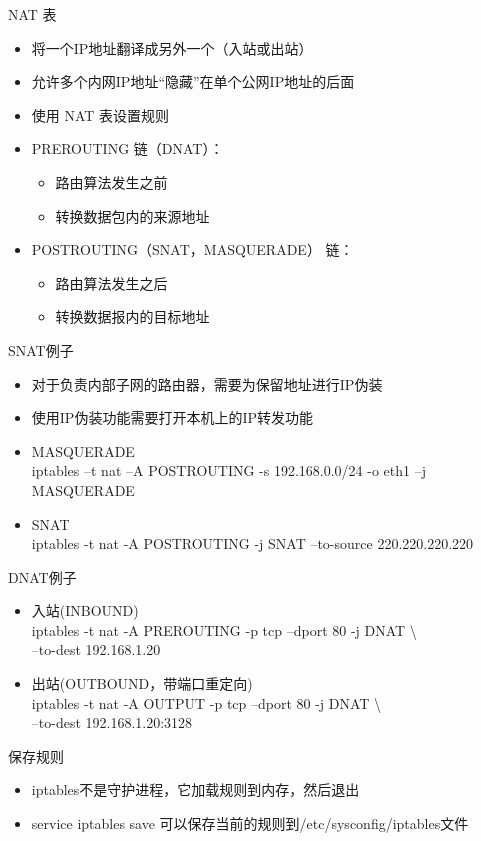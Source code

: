  \begin{frame}{NAT 表}


\begin{itemize}
\item 将一个IP地址翻译成另外一个（入站或出站）
\item 允许多个内网IP地址“隐藏”在单个公网IP地址的后面
\item 使用 NAT 表设置规则
\item PREROUTING 链（DNAT）：

\begin{itemize}
\item 路由算法发生之前
\item 转换数据包内的来源地址
\end{itemize}
\item POSTROUTING（SNAT，MASQUERADE） 链：

\begin{itemize}
\item 路由算法发生之后
\item 转换数据报内的目标地址
\end{itemize}
\end{itemize}

\end{frame} 
 \begin{frame}{SNAT例子}
\begin{itemize}
\item 对于负责内部子网的路由器，需要为保留地址进行IP伪装
\item 使用IP伪装功能需要打开本机上的IP转发功能
\item MASQUERADE\\
iptables –t nat –A POSTROUTING -s 192.168.0.0/24 -o eth1 –j MASQUERADE
\item SNAT\\
iptables -t nat -A POSTROUTING -j SNAT --to-source 220.220.220.220
\end{itemize}

\end{frame} 
 \begin{frame}{DNAT例子}
\begin{itemize}
\item 入站(INBOUND)\\
iptables -t nat -A PREROUTING -p tcp --dport 80 -j DNAT \textbackslash{}\\
--to-dest 192.168.1.20
\item 出站(OUTBOUND，带端口重定向)\\
iptables -t nat -A OUTPUT -p tcp --dport 80 -j DNAT \textbackslash{}\\
--to-dest 192.168.1.20:3128
\end{itemize}

\end{frame} 
 \begin{frame}{保存规则}
\begin{itemize}
\item iptables不是守护进程，它加载规则到内存，然后退出
\item service iptables save 可以保存当前的规则到/etc/sysconfig/iptables文件
\end{itemize}

\end{frame} 
 

